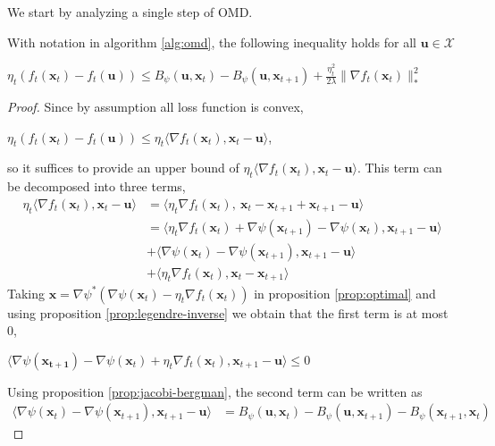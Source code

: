 \documentclass[12pt, a4paper]{report}
\begin{document}
We start by analyzing a single step of OMD.
\begin{lem} \label{lem:step-omd}
With notation in algorithm \ref{alg:omd}, the following inequality holds for all $\mathbf{u} \in \mathcal{X}$
\begin{center}
    $\displaystyle \eta_t(f_t(\mathbf{x}_t) - f_t(\mathbf{u})) \leq  B_\psi(\mathbf{u}, \mathbf{x}_t) - B_\psi(\mathbf{u}, \mathbf{x}_{t+1}) + \frac{\eta_t^2}{2\lambda}\lVert \nabla f_t(\mathbf{x}_t) \rVert_*^2$
\end{center}
\end{lem}
\begin{proof}
Since by assumption all loss function is convex, 
\begin{center}
    $\eta_t(f_t(\mathbf{x}_t) - f_t(\mathbf{u})) \leq \eta_t \langle \nabla f_t(\mathbf{x}_t), \mathbf{x}_t - \mathbf{u} \rangle$,
\end{center}
so it suffices to provide an upper bound of $\eta_t \langle \nabla f_t(\mathbf{x}_t), \mathbf{x}_t - \mathbf{u} \rangle$. This term can be decomposed into three terms,
\begin{align*}
    \eta_t \langle \nabla f_t(\mathbf{x}_t), \mathbf{x}_t - \mathbf{u} \rangle &= \langle \eta_t \nabla f_t(\mathbf{x}_t),\ \mathbf{x}_t - \mathbf{x}_{t+1} + \mathbf{x}_{t+1} - \mathbf{u} \rangle 
    \\
    &= \langle \eta_t \nabla f_t(\mathbf{x}_t) + \nabla \psi(\mathbf{x}_{t+1}) - \nabla \psi(\mathbf{x}_{t}) , \mathbf{x}_{t+1} - \mathbf{u} \rangle 
    \\ 
    &  + \langle \nabla \psi(\mathbf{x}_{t}) - \nabla \psi(\mathbf{x}_{t+1}), \mathbf{x}_{t+1} - \mathbf{u} \rangle 
    \\ 
    &  + \langle \eta_t \nabla f_t(\mathbf{x}_t), \mathbf{x}_t - \mathbf{x}_{t+1} \rangle
\end{align*}
Taking $\mathbf{x} = \nabla \psi^*(\nabla \psi(\mathbf{x}_t) - \eta_t \nabla f_t(\mathbf{x}_t))$ in proposition \ref{prop:optimal} and using proposition \ref{prop:legendre-inverse} we obtain that the first term is at most 0,
\begin{center}
    $\langle \nabla \psi(\mathbf{x_{t+1}}) - \nabla \psi(\mathbf{x}_t) + \eta_t \nabla f_t(\mathbf{x}_t), \mathbf{x}_{t+1} - \mathbf{u} \rangle \leq 0$
\end{center}
Using proposition \ref{prop:jacobi-bergman}, the second term can be written as
\begin{align*}
    \langle \nabla \psi(\mathbf{x}_t) - \nabla \psi(\mathbf{x}_{t+1}), \mathbf{x}_{t+1} - \mathbf{u} \rangle &= B_\psi(\mathbf{u}, \mathbf{x}_t) - B_\psi(\mathbf{u}, \mathbf{x}_{t+1}) - B_\psi(\mathbf{x}_{t+1}, \mathbf{x}_t)

\end{align*}
\end{proof}
\end{document}
